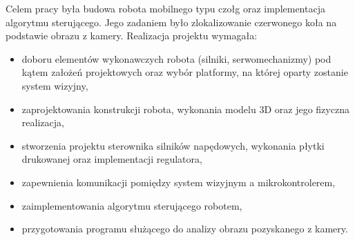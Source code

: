 Celem pracy była budowa robota mobilnego typu czołg oraz implementacja algorytmu sterującego. Jego zadaniem było zlokalizowanie czerwonego koła na podstawie obrazu z kamery. Realizacja projektu wymagała:
\begin{itemize}
\item doboru elementów wykonawczych robota (silniki, serwomechanizmy) pod kątem założeń projektowych oraz wybór platformy, na której oparty zostanie system wizyjny,
\item zaprojektowania konstrukcji robota, wykonania modelu 3D oraz jego fizyczna realizacja,
\item stworzenia projektu sterownika silników napędowych, wykonania płytki drukowanej oraz implementacji regulatora,
\item zapewnienia komunikacji pomiędzy system wizyjnym a mikrokontrolerem,
\item zaimplementowania algorytmu sterującego robotem,
\item przygotowania programu służącego do analizy obrazu pozyskanego z kamery.
\end{itemize}

